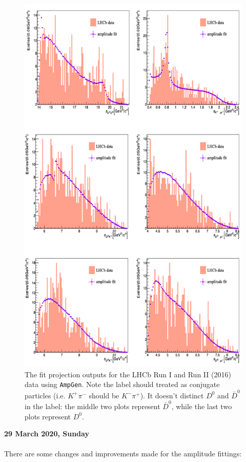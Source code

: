\begin{figure}[h]
\center
\includegraphics*[width=0.76\linewidth]{amplitude_fit/amp_fit_proj_conj}
\caption{The fit projection outputs for the LHCb Run I and Run II (2016) data using \texttt{AmpGen}. Note the label should treated as conjugate particles (i.e. $K^+\pi^-$ should be $K^-\pi^+$). It doesn't distinct $D^0$ and $\bar{D}^0$ in the label: the middle two plots represent $\bar{D}^0$, while the last two plots represent $D^0$.}
\label{amp_fit_proj_conj}
\end{figure}
\clearpage
 \clearpage
\noindent\textbf{29 March 2020, Sunday}
\\
\\
There are some changes and improvements made for the amplitude fittings:
